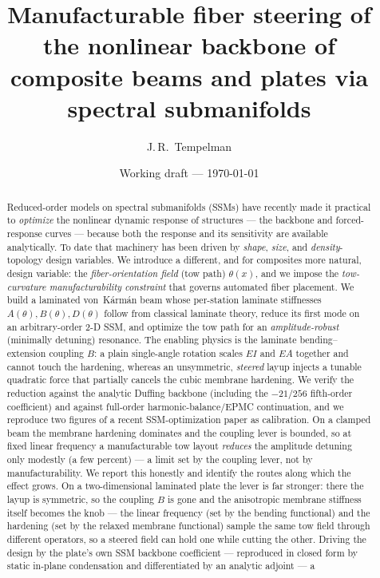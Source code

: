 \documentclass[11pt]{article}
\title{\bfseries Manufacturable fiber steering of the nonlinear backbone of
composite beams and plates via spectral submanifolds}
\author{J.\,R.\ Tempelman}
\date{Working draft --- \today}
\begin{document}
\maketitle

\begin{abstract}
Reduced-order models on spectral submanifolds (SSMs) have recently made it
practical to \emph{optimize} the nonlinear dynamic response of structures --- the
backbone and forced-response curves --- because both the response and its
sensitivity are available analytically. To date that machinery has been driven
by \emph{shape}, \emph{size}, and \emph{density}-topology design variables. We
introduce a different, and for composites more natural, design variable: the
\emph{fiber-orientation field} (tow path) $\theta(x)$, and we impose the
\emph{tow-curvature manufacturability constraint} that governs automated fiber
placement. We build a laminated von~K\'arm\'an beam whose per-station laminate
stiffnesses $A(\theta),B(\theta),D(\theta)$ follow from classical laminate
theory, reduce its first mode on an arbitrary-order 2-D SSM, and optimize the
tow path for an \emph{amplitude-robust} (minimally detuning) resonance. The
enabling physics is the laminate bending--extension coupling $B$: a plain
single-angle rotation scales $EI$ and $EA$ together and cannot touch the
hardening, whereas an unsymmetric, \emph{steered} layup injects a tunable
quadratic force that partially cancels the cubic membrane hardening. We verify
the reduction against the analytic Duffing backbone (including the $-21/256$
fifth-order coefficient) and against full-order harmonic-balance/EPMC
continuation, and we reproduce two figures of a recent SSM-optimization paper as
calibration. On a clamped beam the membrane hardening dominates and the coupling
lever is bounded, so at fixed linear frequency a manufacturable tow layout
\emph{reduces} the amplitude detuning only modestly (a few percent) --- a limit
set by the coupling lever, not by manufacturability. We report this honestly and
identify the routes along which the effect grows. On a two-dimensional laminated
plate the lever is far stronger: there the layup is symmetric, so the coupling
$B$ is gone and the anisotropic membrane stiffness itself becomes the knob ---
the linear frequency (set by the bending functional) and the hardening (set by
the relaxed membrane functional) sample the same tow field through different
operators, so a steered field can hold one while cutting the other. Driving the
design by the plate's own SSM backbone coefficient --- reproduced in closed form
by static in-plane condensation and differentiated by an analytic adjoint --- a

\end{abstract}
\end{document}
